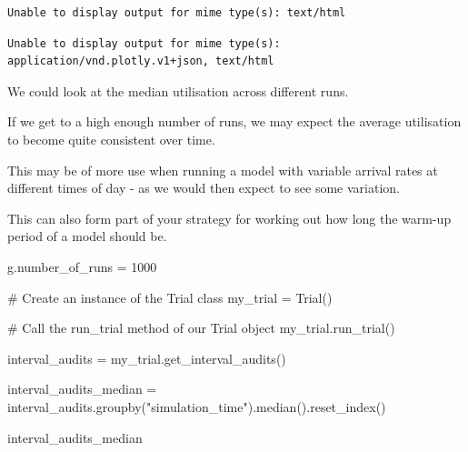 \documentclass[
  letterpaper,
  DIV=11,
  numbers=noendperiod]{scrreprt}
\newenvironment{Shaded}{\begin{snugshade}}{\end{snugshade}}
\newcommand{\CommentTok}[1]{\textcolor[rgb]{0.37,0.37,0.37}{#1}}
\newcommand{\DecValTok}[1]{\textcolor[rgb]{0.68,0.00,0.00}{#1}}
\newcommand{\NormalTok}[1]{\textcolor[rgb]{0.00,0.23,0.31}{#1}}
\newcommand{\OperatorTok}[1]{\textcolor[rgb]{0.37,0.37,0.37}{#1}}
\newcommand{\StringTok}[1]{\textcolor[rgb]{0.13,0.47,0.30}{#1}}
\begin{document}
\begin{verbatim}
Unable to display output for mime type(s): text/html
\end{verbatim}

\begin{verbatim}
Unable to display output for mime type(s): application/vnd.plotly.v1+json, text/html
\end{verbatim}

We could look at the median utilisation across different runs.

If we get to a high enough number of runs, we may expect the average
utilisation to become quite consistent over time.

\begin{tcolorbox}[enhanced jigsaw, rightrule=.15mm, colback=white, colframe=quarto-callout-tip-color-frame, colbacktitle=quarto-callout-tip-color!10!white, toprule=.15mm, coltitle=black, opacityback=0, titlerule=0mm, bottomtitle=1mm, breakable, title=\textcolor{quarto-callout-tip-color}{\faLightbulb}\hspace{0.5em}{Tip}, opacitybacktitle=0.6, toptitle=1mm, arc=.35mm, bottomrule=.15mm, leftrule=.75mm, left=2mm]

This may be of more use when running a model with variable arrival rates
at different times of day - as we would then expect to see some
variation.

\end{tcolorbox}

\begin{tcolorbox}[enhanced jigsaw, rightrule=.15mm, colback=white, colframe=quarto-callout-tip-color-frame, colbacktitle=quarto-callout-tip-color!10!white, toprule=.15mm, coltitle=black, opacityback=0, titlerule=0mm, bottomtitle=1mm, breakable, title=\textcolor{quarto-callout-tip-color}{\faLightbulb}\hspace{0.5em}{Tip}, opacitybacktitle=0.6, toptitle=1mm, arc=.35mm, bottomrule=.15mm, leftrule=.75mm, left=2mm]

This can also form part of your strategy for working out how long the
warm-up period of a model should be.

\end{tcolorbox}

\begin{Shaded}
\begin{Highlighting}[]
\NormalTok{g.number\_of\_runs }\OperatorTok{=} \DecValTok{1000}

\CommentTok{\# Create an instance of the Trial class}
\NormalTok{my\_trial }\OperatorTok{=}\NormalTok{ Trial()}

\CommentTok{\# Call the run\_trial method of our Trial object}
\NormalTok{my\_trial.run\_trial()}

\NormalTok{interval\_audits }\OperatorTok{=}\NormalTok{ my\_trial.get\_interval\_audits()}

\NormalTok{interval\_audits\_median }\OperatorTok{=}\NormalTok{ interval\_audits.groupby(}\StringTok{"simulation\_time"}\NormalTok{).median().reset\_index()}

\NormalTok{interval\_audits\_median}
\end{Highlighting}
\end{Shaded}
\end{document}
